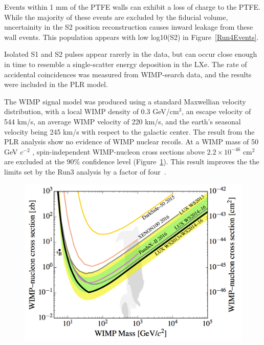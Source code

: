 Events within 1 mm of the PTFE walls can exhibit a loss of charge to the PTFE.  While the majority of these events are excluded by the fiducial volume, uncertainity in the S2 position reconstruction causes inward leakage from these wall events.  This population appears with low log10(S2) in Figure~\ref{Run4Events}.

 Isolated S1 and S2 pulses appear rarerly in the data, but can occur close enough in time to resemble a single-scatter energy deposition in the LXe.  The rate of accidental coincidences was measured from WIMP-search data, and the results were included in the PLR model.

The WIMP signal model was produced using a standard Maxwellian velocity distribution, with a local WIMP density of 0.3 GeV/cm$^3$, an escape velocity of 544 km/s, an average WIMP velocity of 220 km/s, and the earth’s seasonal velocity being 245 km/s with respect to the galactic center.  The result from the PLR analysis show no evidence of WIMP nuclear recoils.  At a WIMP mass of 50  GeV $c^{-2}$ , spin-independent WIMP-nucleon cross sections above $2.2\times10^{-46}$ cm$^2$ are excluded at the 90\% confidence level (Figure~\ref{Run4Limit}).  This result improves the the limits set by the Run3 analysis by a factor of four~\cite{Akerib:2015rjg}.

 \begin{figure} 
\includegraphics[scale=.4]{Run4Limit.png} 
\label{Run4Limit}
\end{figure}
